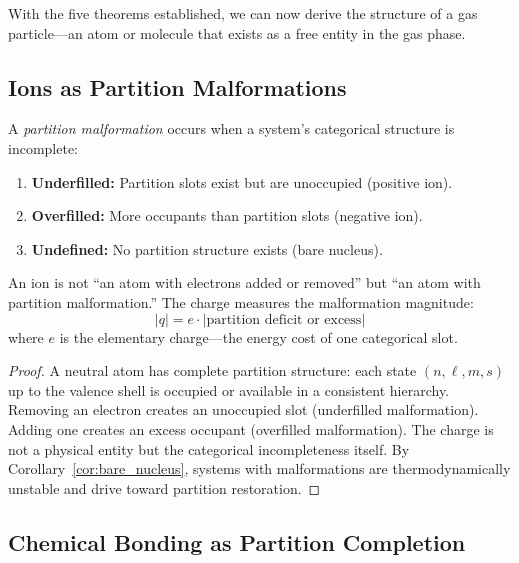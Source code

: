 With the five theorems established, we can now derive the structure of a gas particle---an atom or molecule that exists as a free entity in the gas phase.

\subsection{Ions as Partition Malformations}

\begin{definition}
\label{def:malformation}
A \emph{partition malformation} occurs when a system's categorical structure is incomplete:
\begin{enumerate}
    \item \textbf{Underfilled:} Partition slots exist but are unoccupied (positive ion).
    \item \textbf{Overfilled:} More occupants than partition slots (negative ion).
    \item \textbf{Undefined:} No partition structure exists (bare nucleus).
\end{enumerate}
\end{definition}

\begin{theorem}
\label{thm:ion}
An ion is not ``an atom with electrons added or removed'' but ``an atom with partition malformation.'' The charge measures the malformation magnitude:
\begin{equation}
    |q| = e \cdot |\text{partition deficit or excess}|
\end{equation}
where $e$ is the elementary charge---the energy cost of one categorical slot.
\end{theorem}

\begin{proof}
A neutral atom has complete partition structure: each state $(n, \ell, m, s)$ up to the valence shell is occupied or available in a consistent hierarchy. Removing an electron creates an unoccupied slot (underfilled malformation). Adding one creates an excess occupant (overfilled malformation). The charge is not a physical entity but the categorical incompleteness itself. By Corollary~\ref{cor:bare_nucleus}, systems with malformations are thermodynamically unstable and drive toward partition restoration.
\end{proof}

\subsection{Chemical Bonding as Partition Completion}

